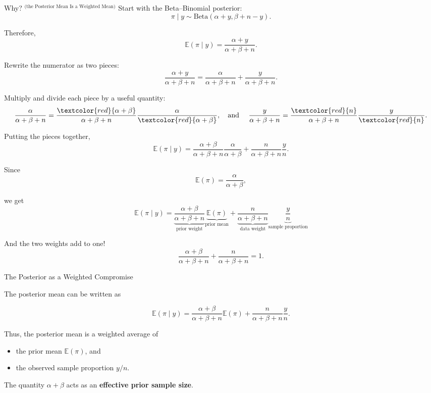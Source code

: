 \documentclass[aspectratio=43]{beamer}
\begin{document}
\begin{frame}{Why? $^\text{(the Posterior Mean Is a Weighted Mean)}$}
Start with the Beta--Binomial posterior:
\[
\pi \mid y
\sim
\mathrm{Beta}(\alpha+y,\beta+n-y).
\]

Therefore,
\[
\mathbb{E}(\pi \mid y)
=
\frac{\alpha+y}{\alpha+\beta+n}.
\]

Rewrite the numerator as two pieces:
\[
\frac{\alpha+y}{\alpha+\beta+n}
=
\frac{\alpha}{\alpha+\beta+n}
+
\frac{y}{\alpha+\beta+n}.
\]

\pause

\vspace{.4cm}
Multiply and divide each piece by a useful quantity:
\[
\frac{\alpha}{\alpha+\beta+n}
=
\frac{\textcolor{red}{\alpha+\beta}}{\alpha+\beta+n}
\frac{\alpha}{\textcolor{red}{\alpha+\beta}},
\text{\quad and \quad}
\frac{y}{\alpha+\beta+n}
=
\frac{\textcolor{red}{n}}{\alpha+\beta+n}
\frac{y}{\textcolor{red}{n}}.
\]

\end{frame}

\begin{frame}{}
Putting the pieces together,
\[
\mathbb{E}(\pi\mid y)
=
\frac{\alpha+\beta}{\alpha+\beta+n}
\frac{\alpha}{\alpha+\beta}
+
\frac{n}{\alpha+\beta+n}
\frac{y}{n}.
\]

Since
\[
\mathbb{E}(\pi)=\frac{\alpha}{\alpha+\beta},
\]

we get
\[
\boxed{
\mathbb{E}(\pi\mid y)
=
\underbrace{
\frac{\alpha+\beta}{\alpha+\beta+n}
}_{\text{prior weight}}
\underbrace{
\mathbb{E}(\pi)
}_{\text{prior mean}}
+
\underbrace{
\frac{n}{\alpha+\beta+n}
}_{\text{data weight}}
\underbrace{
\frac{y}{n}
}_{\text{sample proportion}}
}
\]

And the two weights add to one!
\[
\frac{\alpha+\beta}{\alpha+\beta+n}
+
\frac{n}{\alpha+\beta+n}
=1.
\]

\end{frame}

\begin{frame}{The Posterior as a Weighted Compromise}

The posterior mean can be written as

\[
\mathbb{E}(\pi\mid y)
=
\frac{\alpha+\beta}
     {\alpha+\beta+n}
\mathbb{E}(\pi)
+
\frac{n}
     {\alpha+\beta+n}
\frac{y}{n}.
\]

\vspace{0.35cm}

Thus, the posterior mean is a weighted average of

\begin{itemize}
  \item the prior mean $\mathbb{E}(\pi)$, and
  \item the observed sample proportion $y/n$.
\end{itemize}

\vspace{0.25cm}

The quantity $\alpha+\beta$ acts as an
\textbf{effective prior sample size}.

\end{frame}
\end{document}
